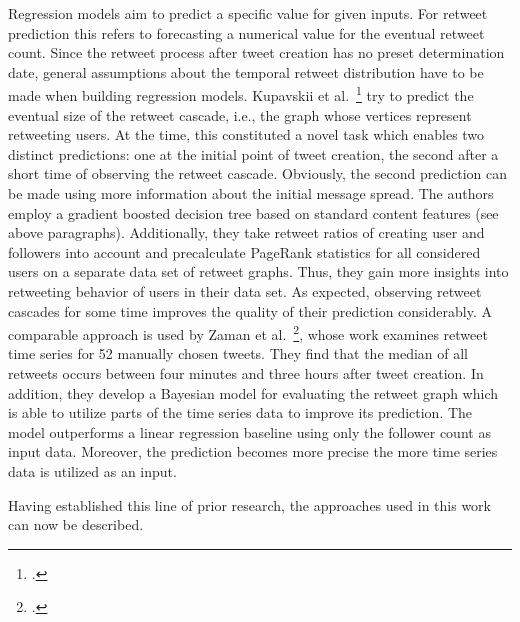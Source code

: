 Regression models aim to predict a specific value for given inputs.
For retweet prediction this refers to forecasting a numerical value for the
eventual retweet count.
Since the retweet process after tweet creation has no preset determination date, general assumptions
about the temporal retweet distribution have to be made when building
regression models.
Kupavskii et al.~\footcite{Kupavskii2012} try to predict the eventual size of the
retweet cascade, i.e., the graph whose vertices represent retweeting users.
At the time, this constituted a novel task which enables two distinct predictions:
one at the initial point of tweet creation, the second after a short
time of observing the retweet cascade.
Obviously, the second prediction can be made using more information about the
initial message spread.
The authors employ a gradient boosted decision tree based on standard content
features (see above paragraphs).
Additionally, they take retweet ratios of creating user and followers into
account and precalculate PageRank statistics for all considered users on a
separate data set of retweet graphs.
Thus, they gain more insights into retweeting behavior of users in their data
set.
As expected, observing retweet cascades for some time improves the quality
of their prediction considerably.
A comparable approach is used by Zaman et al.~\footcite{Zaman2014}, whose work
examines retweet time series for 52 manually chosen tweets.
They find that the median of all retweets occurs between four minutes and three
hours after tweet creation.
In addition, they develop a Bayesian model for evaluating the retweet graph
which is able to utilize parts of the time series data to improve its
prediction.
The model outperforms a linear regression baseline using only
the follower count as input data.
Moreover, the prediction becomes more precise the more time series data is utilized
as an input.

Having established this line of prior research, the approaches used in this
work can now be described.
